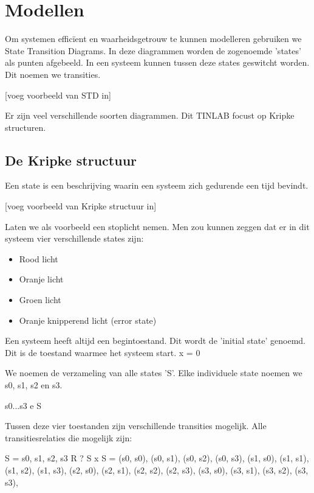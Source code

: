 \documentclass{article}
\begin{document}
	\newpage
	
	
	\section{Modellen}
	
	Om systemen efficïent en waarheidsgetrouw te kunnen modelleren gebruiken we State Transition Diagrams. In deze diagrammen worden de zogenoemde 'states' als punten afgebeeld. In een systeem kunnen tussen deze states geswitcht worden. Dit noemen we transities.

	[voeg voorbeeld van STD in]

	Er zijn veel verschillende soorten diagrammen. Dit TINLAB focust op Kripke structuren.
	
		\subsection{De Kripke structuur}
		
		Een state is een beschrijving waarin een systeem zich gedurende een tijd bevindt.

		[voeg voorbeeld van Kripke structuur in]

		Laten we als voorbeeld een stoplicht nemen. Men zou kunnen zeggen dat er in dit systeem vier verschillende states zijn:

		\begin{itemize}
			\item Rood licht
			\item Oranje licht
			\item Groen licht
			\item Oranje knipperend licht (error state)
		\end{itemize}

		Een systeem heeft altijd een begintoestand. Dit wordt de 'initial state' genoemd. Dit is de toestand waarmee het systeem start. 
		x = 0

		We noemen de verzameling van alle states 'S'. Elke individuele state noemen we s0, s1, s2 en s3.

		s0...s3 e S

		Tussen deze vier toestanden zijn verschillende transities mogelijk. Alle transitiesrelaties die mogelijk zijn:

		S = {s0, s1, s2, s3}
		R ? S x S = {
			(s0, s0), (s0, s1), (s0, s2), (s0, s3),
			(s1, s0), (s1, s1), (s1, s2), (s1, s3),
			(s2, s0), (s2, s1), (s2, s2), (s2, s3),
			(s3, s0), (s3, s1), (s3, s2), (s3, s3),
		}
\end{document}
